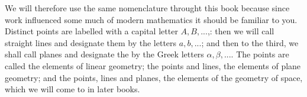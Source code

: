 We will therefore use the same nomenclature throught this book because since work influenced some much of modern mathematics it should be familiar to you. Distinct points are labelled with a capital letter $A,B,...$,: then we will call straight lines and designate them by the letters $a,b,...$; and then to the third, we shall call planes and designate the by the Greek letters $\alpha,\beta,...$.
The points are called the elements of linear geometry; the points and lines, the elements of plane geometry; and the points, lines and planes, the elements of the geometry of space, which we will come to in later books.

\clearpage

